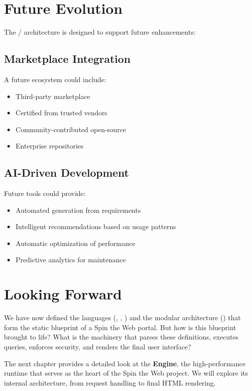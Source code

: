 \section{Future Evolution}
\label{sec:future-evolution}

The \webbase{}/\webbaselet{} architecture is designed to support future enhancements:

\subsection{Marketplace Integration}

A future ecosystem could include:
\begin{itemize}
\item Third-party \webbaselet{} marketplace
\item Certified  from trusted vendors
\item Community-contributed open-source 
\item Enterprise \webbaselet{} repositories
\end{itemize}

\subsection{AI-Driven Development}

Future tools could provide:
\begin{itemize}
\item Automated \webbaselet{} generation from requirements
\item Intelligent \webbaselet{} recommendations based on usage patterns
\item Automatic optimization of \webbaselet{} performance
\item Predictive analytics for \webbaselet{} maintenance
\end{itemize}

\section{Looking Forward}
\label{sec:webbaselets-forward}

We have now defined the languages (\wbol{}, \wbpl{}, \wbll{}) and the modular architecture () that form the static blueprint of a Spin the Web portal. But how is this blueprint brought to life? What is the machinery that parses these definitions, executes queries, enforces security, and renders the final user interface?

The next chapter provides a detailed look at the \textbf{\webspinner{} Engine}, the high-performance runtime that serves as the heart of the Spin the Web project. We will explore its internal architecture, from request handling to final HTML rendering.
